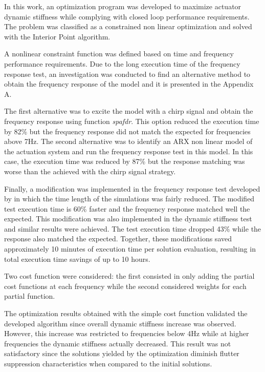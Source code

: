 
In this work, an optimization program was developed to maximize actuator dynamic stiffness while complying with closed loop performance requirements. The problem was classified as a constrained non linear optimization and solved with the Interior Point algorithm.

A nonlinear constraint function was defined based on time and frequency performance requirements. Due to the long execution time of the frequency response test, an investigation was conducted to find an alternative method to obtain the frequency response of the model and it is presented in the Appendix A. 

The first alternative was to excite the model with a chirp signal and obtain the frequency response using function \textit{spafdr}. This option reduced the execution time by 82\% but the frequency response did not match the expected for frequencies above 7Hz. The second alternative was to identify an ARX non linear model of the actuation system and run the frequency response test in this model. In this case, the execution time was reduced by 87\% but the response matching was worse than the achieved with the chirp signal strategy.

Finally, a modification was implemented in the frequency response test developed by  in which the time length of the simulations was fairly reduced. The modified test execution time is 60\% faster and the frequency response matched well the expected. This modification was also implemented in the dynamic stiffness test and similar results were achieved. The test execution time dropped 43\% while the response also matched the expected. Together, these modifications saved approximately 10 minutes of execution time per solution evaluation, resulting in total execution time savings of up to 10 hours.

Two cost function were considered: the first consisted in only adding the partial cost functions at each frequency while the second considered weights for each partial function. 

The optimization results obtained with the simple cost function validated the developed algorithm since overall dynamic stiffness increase was observed. However, this increase was restricted to frequencies below 4Hz while at higher frequencies the dynamic stiffness actually decreased. This result was not satisfactory since the solutions yielded by the optimization diminish flutter suppression characteristics when compared to the initial solutions.

